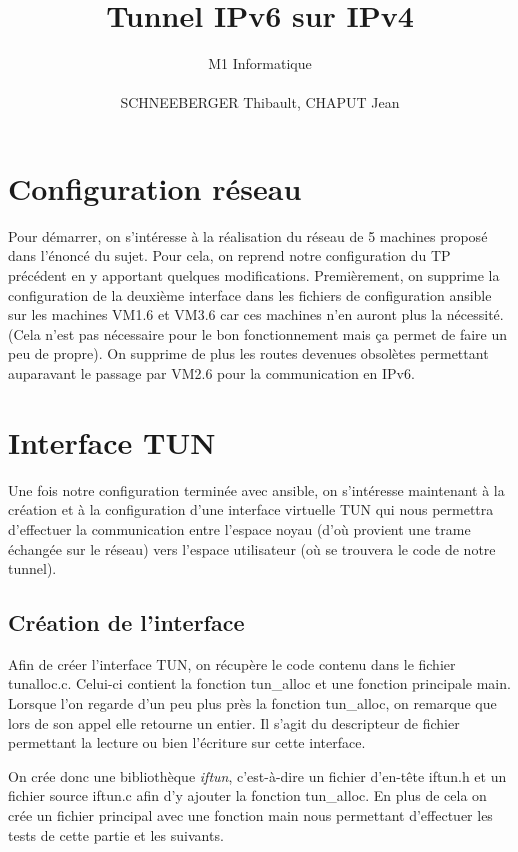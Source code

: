 \documentclass[a4paper, 12pt]{article}
\title{Tunnel IPv6 sur IPv4}
\author{M1 Informatique \\\\ SCHNEEBERGER Thibault, CHAPUT Jean}
\date{}
\begin{document}
    \maketitle
    \newpage
    \tableofcontents
    \newpage

    \section{Configuration réseau}
    Pour démarrer, on s'intéresse à la réalisation du réseau de 5 machines
    proposé dans l'énoncé du sujet. Pour cela, on reprend notre configuration
    du TP précédent en y apportant quelques modifications. Premièrement, on
    supprime la configuration de la deuxième interface dans les fichiers de 
    configuration ansible sur les machines VM1.6 et VM3.6 car ces machines
    n'en auront plus la nécessité. (Cela n'est pas nécessaire pour le bon
    fonctionnement mais ça permet de faire un peu de propre). On supprime de 
    plus les routes devenues obsolètes permettant auparavant le passage par 
    VM2.6 pour la communication en IPv6.

    \section{Interface TUN}
    Une fois notre configuration terminée avec ansible, on s'intéresse 
    maintenant à la création et à la configuration d'une interface virtuelle
    TUN qui nous permettra d'effectuer la communication entre l'espace noyau
    (d'où provient une trame échangée sur le réseau) vers l'espace utilisateur
    (où se trouvera le code de notre tunnel).

    \subsection{Création de l'interface}
    Afin de créer l'interface TUN, on récupère le code contenu dans le 
    fichier tunalloc.c. Celui-ci contient la fonction tun\_alloc et une 
    fonction principale main. Lorsque l'on regarde d'un peu plus près la 
    fonction tun\_alloc, on remarque que lors de son appel elle retourne
    un entier. Il s'agit du descripteur de fichier permettant la lecture
    ou bien l'écriture sur cette interface.

    \medbreak{}

    On crée donc une bibliothèque \textit{iftun}, c'est-à-dire un fichier
    d'en-tête iftun.h et un fichier source iftun.c afin d'y ajouter la fonction
    tun\_alloc. En plus de cela on crée un fichier principal avec une fonction 
    main nous permettant d'effectuer les tests de cette partie et les suivants.
\end{document}
